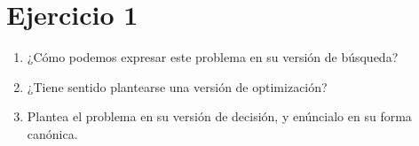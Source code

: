 \section{Ejercicio 1}

\begin{tcolorbox}[enunciado]
\begin{enumerate}[label=(\alph*), leftmargin=*]
    \item ¿Cómo podemos expresar este problema en su versión de búsqueda?
    \item ¿Tiene sentido plantearse una versión de optimización?
    \item Plantea el problema en su versión de decisión, y enúncialo en su forma canónica.
\end{enumerate}
\end{tcolorbox}

